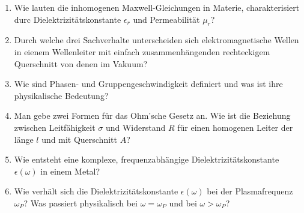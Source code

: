 \documentclass{scrartcl}
\begin{document}
\begin{enumerate}
    \item Wie lauten die inhomogenen Maxwell-Gleichungen in Materie,
          charakterisiert durc Dielektrizitätskonstante $\epsilon_r$ und
          Permeabilität $\mu_r$?\\

    \item Durch welche drei Sachverhalte unterscheiden sich 
          elektromagnetische Wellen in eienem Wellenleiter mit einfach
          zusammenhängenden rechteckigem Querschnitt von denen im Vakuum?\\

    \item Wie sind Phasen- und Gruppengeschwindigkeit definiert und was ist
          ihre physikalische Bedeutung?\\

    \item Man gebe zwei Formen für das Ohm'sche Gesetz an. Wie ist die
          Beziehung zwischen Leitfähigkeit $\sigma$ und Widerstand $R$ 
          für einen homogenen Leiter der länge $l$ und mit 
          Querschnitt $A$?\\

    \item Wie entsteht eine komplexe, frequenzabhängige 
          Dielektrizitätskonstante $\epsilon(\omega)$ in einem Metal?\\

    \item Wie verhält sich die Dielektrizitätskonstante $\epsilon(\omega)$
          bei der Plasmafrequenz $\omega_P$? Was passiert physikalisch bei
          $\omega=\omega_P$ und bei $\omega>\omega_P$?\\

  \end{enumerate}
    
\end{document}
